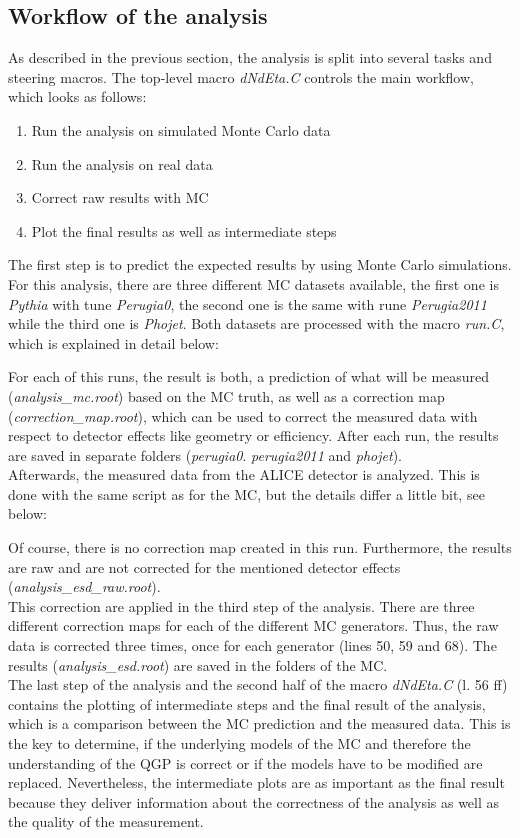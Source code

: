 \documentclass{article}
\begin{document}
\subsection{Workflow of the analysis}
As described in the previous section, the analysis is split into several tasks and steering macros. The top-level macro \textit{dNdEta.C} controls the main workflow, which looks as follows:
\begin{enumerate}
\item Run the analysis on simulated Monte Carlo data
\item Run the analysis on real data
\item Correct raw results with MC
\item Plot the final results as well as intermediate steps
\end{enumerate}
The first step is to predict the expected results by using Monte Carlo simulations. For this analysis, there are three different MC datasets available, the first one is \textit{Pythia} with tune \textit{Perugia0}, the second one is the same with rune \textit{Perugia2011} while the third one is \textit{Phojet}. Both datasets are processed with the macro \textit{run.C}, which is explained in detail below:

For each of this runs, the result is both, a prediction of what will be measured (\textit{analysis\_mc.root}) based on the MC truth, as well as a correction map (\textit{correction\_map.root}), which can be used to correct the measured data with respect to detector effects like geometry or efficiency. After each run, the results are saved in separate folders (\textit{perugia0}. \textit{perugia2011} and \textit{phojet}).\\
Afterwards, the measured data from the ALICE detector is analyzed. This is done with the same script as for the MC, but the details differ a little bit, see below:

Of course, there is no correction map created in this run. Furthermore, the results are raw and are not corrected for the mentioned detector effects (\textit{analysis\_esd\_raw.root}).\\
This correction are applied in the third step of the analysis. There are three different correction maps for each of the different MC generators. Thus, the raw data is corrected three times, once for each generator (lines 50, 59 and 68). The results (\textit{analysis\_esd.root}) are saved in the folders of the MC.\\
The last step of the analysis and the second half of the macro \textit{dNdEta.C} (l. 56 ff) contains the plotting of intermediate steps and the final result of the analysis, which is a comparison between the MC prediction and the measured data. This is the key to determine, if the underlying models of the MC and therefore the understanding of the QGP is correct or if the models have to be modified are replaced. Nevertheless, the intermediate plots are as important as the final result because they deliver information about the correctness of the analysis as well as the quality of the measurement.
\end{document}
